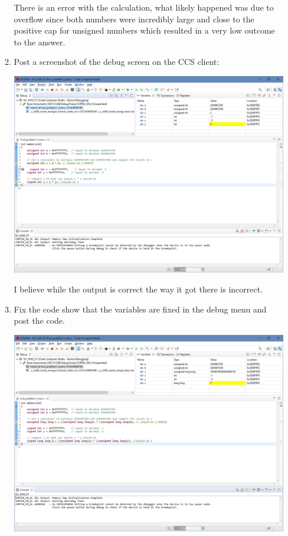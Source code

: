 \documentclass{article}
\begin{document}
\begin{enumerate}
\begin{enumerate}
\begin{center}
            There is an error with the calculation, what likely happened was due to overflow since both numbers were incredibly large and close to the positive cap for unsigned numbers which resulted in a very low outcome to the answer.    
        \end{center}
        \newpage
        \item Post a screenshot of the debug screen on the CCS client:
        \begin{center}
            \includegraphics[width = .9\textwidth]{1f.png}
            
            I believe while the output is correct the way it got there is incorrect.
        \end{center}
        \newpage
        \item Fix the code show that the variables are fixed in the debug menu and post the code.
        \begin{center}
            \includegraphics[width = .9\textwidth]{1g.png}
            

\end{center}
\end{enumerate}
\end{enumerate}
\end{document}
